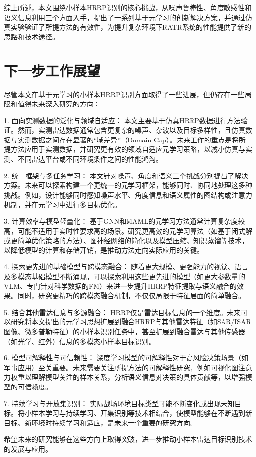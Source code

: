 综上所述，本文围绕小样本HRRP识别的核心挑战，从噪声鲁棒性、角度敏感性和语义信息利用三个方面入手，提出了一系列基于元学习的创新解决方案，并通过仿真实验验证了所提方法的有效性，为提升复杂环境下RATR系统的性能提供了新的思路和技术途径。

\section{下一步工作展望}
\label{sec:outlook}

尽管本文在基于元学习的小样本HRRP识别方面取得了一些进展，但仍存在一些局限和值得未来深入研究的方向：

1.  面向实测数据的泛化与领域自适应： 本文主要基于仿真HRRP数据进行方法验证。然而，实测雷达数据通常包含更复杂的噪声、杂波以及目标多样性，且仿真数据与实测数据之间存在显著的“域差异”（Domain Gap）。未来工作的重点是将所提方法应用于实测数据，并研究更有效的领域自适应元学习策略，以减小仿真与实测、不同雷达平台或不同环境条件之间的性能鸿沟。

2.  统一框架与多任务学习： 本文针对噪声、角度和语义三个挑战分别提出了解决方案。未来可以探索构建一个更统一的元学习框架，能够同时、协同地处理这多种挑战。例如，设计能够同时感知噪声水平、角度信息和语义属性的图结构或注意力机制，并在元学习中进行多目标优化。

3.  计算效率与模型轻量化： 基于GNN和MAML的元学习方法通常计算复杂度较高，可能不适用于实时性要求高的场景。研究更高效的元学习算法（如基于闭式解或更简单优化策略的方法）、图神经网络的简化以及模型压缩、知识蒸馏等技术，以降低模型的计算和存储开销，是推动方法走向实际应用的关键。

4.  探索更先进的基础模型与跨模态融合： 随着更大规模、更强能力的视觉、语言及多模态基础模型不断涌现，可以探索利用这些更先进的模型（如更大参数量的VLM、专门针对科学数据的FM）来进一步提升HRRP特征提取与语义融合的效果。同时，研究更精巧的跨模态融合机制，不仅仅局限于特征层面的简单融合。

5.  结合其他雷达信息与多源融合： HRRP仅是雷达目标信息的一个维度。未来可以研究将本文提出的元学习思想扩展到融合HRRP与其他雷达特征（如SAR/ISAR图像、微多普勒特征）的小样本识别任务中，甚至扩展到融合雷达与其他传感器（如光学、红外）信息的多模态小样本目标识别。

6.  模型可解释性与可信赖性： 深度学习模型的可解释性对于高风险决策场景（如军事应用）至关重要。未来需要关注所提方法的可解释性研究，例如可视化图注意力权重以理解模型关注的样本关系，分析语义信息对决策的具体贡献等，以增强模型的可信赖度。

7.  持续学习与开放集识别： 实际战场环境目标类型可能不断变化或出现未知目标。将小样本学习与持续学习、开集识别等技术相结合，使模型能够在不断遇到新目标、新环境时持续学习和适应，是未来一个重要的研究方向。

希望未来的研究能够在这些方向上取得突破，进一步推动小样本雷达目标识别技术的发展与应用。